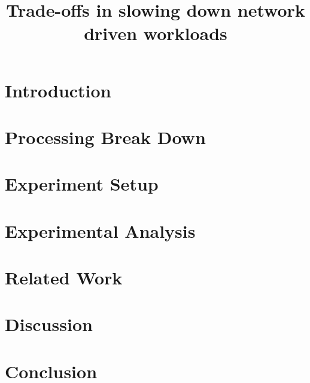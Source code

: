 \documentclass[sigplan,10pt]{acmart}
\begin{document}
\title{Trade-offs in slowing down network driven workloads}


\maketitle
\pagestyle{plain} %

\section{Introduction}


\section{Processing Break Down}


\section{Experiment Setup}


\section{Experimental Analysis}





\section{Related Work}


\section{Discussion}
%

\section{Conclusion}



\end{document}

